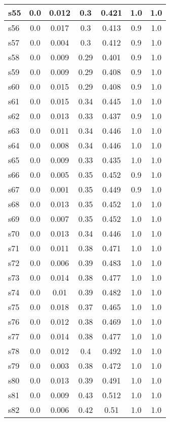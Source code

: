 \documentclass{article}
\begin{document}
\begin{tabular}{|l|c|c|c|c|c|c|}
\hline
s55 &0.0 & 0.012 & 0.3 & 0.421 & 1.0 & 1.0\\
\hline
s56 &0.0 & 0.017 & 0.3 & 0.413 & 0.9 & 1.0\\
\hline
s57 &0.0 & 0.004 & 0.3 & 0.412 & 0.9 & 1.0\\
\hline
s58 &0.0 & 0.009 & 0.29 & 0.401 & 0.9 & 1.0\\
\hline
s59 &0.0 & 0.009 & 0.29 & 0.408 & 0.9 & 1.0\\
\hline
s60 &0.0 & 0.015 & 0.29 & 0.408 & 0.9 & 1.0\\
\hline
s61 &0.0 & 0.015 & 0.34 & 0.445 & 1.0 & 1.0\\
\hline
s62 &0.0 & 0.013 & 0.33 & 0.437 & 0.9 & 1.0\\
\hline
s63 &0.0 & 0.011 & 0.34 & 0.446 & 1.0 & 1.0\\
\hline
s64 &0.0 & 0.008 & 0.34 & 0.446 & 1.0 & 1.0\\
\hline
s65 &0.0 & 0.009 & 0.33 & 0.435 & 1.0 & 1.0\\
\hline
s66 &0.0 & 0.005 & 0.35 & 0.452 & 0.9 & 1.0\\
\hline
s67 &0.0 & 0.001 & 0.35 & 0.449 & 0.9 & 1.0\\
\hline
s68 &0.0 & 0.013 & 0.35 & 0.452 & 1.0 & 1.0\\
\hline
s69 &0.0 & 0.007 & 0.35 & 0.452 & 1.0 & 1.0\\
\hline
s70 &0.0 & 0.013 & 0.34 & 0.446 & 1.0 & 1.0\\
\hline
s71 &0.0 & 0.011 & 0.38 & 0.471 & 1.0 & 1.0\\
\hline
s72 &0.0 & 0.006 & 0.39 & 0.483 & 1.0 & 1.0\\
\hline
s73 &0.0 & 0.014 & 0.38 & 0.477 & 1.0 & 1.0\\
\hline
s74 &0.0 & 0.01 & 0.39 & 0.482 & 1.0 & 1.0\\
\hline
s75 &0.0 & 0.018 & 0.37 & 0.465 & 1.0 & 1.0\\
\hline
s76 &0.0 & 0.012 & 0.38 & 0.469 & 1.0 & 1.0\\
\hline
s77 &0.0 & 0.014 & 0.38 & 0.477 & 1.0 & 1.0\\
\hline
s78 &0.0 & 0.012 & 0.4 & 0.492 & 1.0 & 1.0\\
\hline
s79 &0.0 & 0.003 & 0.38 & 0.472 & 1.0 & 1.0\\
\hline
s80 &0.0 & 0.013 & 0.39 & 0.491 & 1.0 & 1.0\\
\hline
s81 &0.0 & 0.009 & 0.43 & 0.512 & 1.0 & 1.0\\
\hline
s82 &0.0 & 0.006 & 0.42 & 0.51 & 1.0 & 1.0\\
\hline

\end{tabular}
\end{document}
